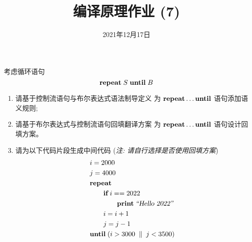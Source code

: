 \documentclass[a4paper, justified]{tufte-handout}
\title{编译原理作业 (7)}
\date{2021年12月17日}
\begin{document}
\maketitle
\noplagiarism %
\begin{abstract}
\end{abstract}
\beginrequired

\begin{problem}[\score{20 = 5 + 10 + 5}]
  考虑循环语句
  \[
    \text{\bf repeat}\; S\; \text{\bf until}\; B
  \]
  \begin{enumerate}[(1)]
    \item 请基于控制流语句与布尔表达式语法制导定义
      为 $\text{\bf repeat}{} \dots \text{\bf until}$ 语句添加语义规则;
    \item 请基于布尔表达式与控制流语句回填翻译方案
      为 $\text{\bf repeat}{} \dots \text{\bf until}$ 语句设计回填方案。
    \item 请为以下代码片段生成中间代码 ({\it 注\emph{:} 请自行选择是否使用回填方案})
      \begin{align*}
        & i = 2000 \\
        & j = 4000 \\
        &\text{\bf repeat} \\
          &\qquad \text{\bf if}\; i == 2022\; \\
          &\qquad\qquad \text{\bf print}\; {\textsl{``Hello 2022''}} \\
          &\qquad i = i + 1 \\
          &\qquad j = j - 1 \\
        &\text{\bf until}\; (i > 3000 \;\parallel\; j < 3500)
      \end{align*}
  \end{enumerate}
\end{problem}
\end{document}

